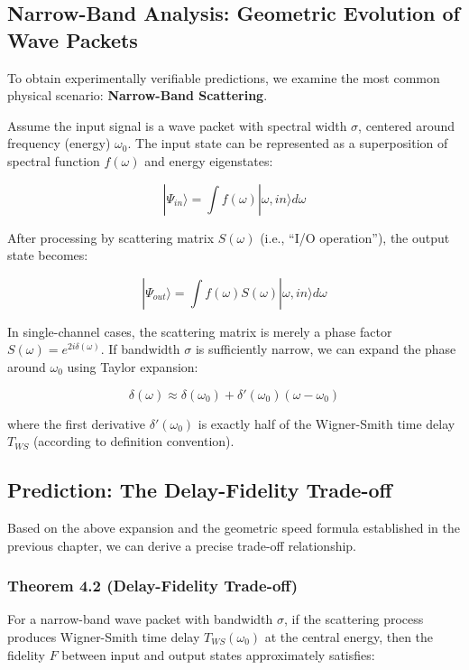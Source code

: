 \documentclass[11pt,a4paper,twoside]{book}
\begin{document}
\subsection{Narrow-Band Analysis: Geometric Evolution of Wave Packets}

To obtain experimentally verifiable predictions, we examine the most common physical scenario: \textbf{Narrow-Band Scattering}.

Assume the input signal is a wave packet with spectral width \textbf{$\sigma$}, centered around frequency (energy) \textbf{$\omega_0$}. The input state can be represented as a superposition of spectral function $f(\omega)$ and energy eigenstates:

$$|\Psi_{in}\rangle = \int f(\omega) |\omega, in\rangle d\omega$$

After processing by scattering matrix $S(\omega)$ (i.e., ``I/O operation''), the output state becomes:

$$|\Psi_{out}\rangle = \int f(\omega) S(\omega) |\omega, in\rangle d\omega$$

In single-channel cases, the scattering matrix is merely a phase factor $S(\omega) = e^{2i\delta(\omega)}$. If bandwidth $\sigma$ is sufficiently narrow, we can expand the phase around $\omega_0$ using Taylor expansion:

$$\delta(\omega) \approx \delta(\omega_0) + \delta'(\omega_0)(\omega - \omega_0)$$

where the first derivative $\delta'(\omega_0)$ is exactly half of the Wigner-Smith time delay $T_{WS}$ (according to definition convention).

\subsection{Prediction: The Delay-Fidelity Trade-off}

Based on the above expansion and the geometric speed formula established in the previous chapter, we can derive a precise trade-off relationship.

\subsubsection{Theorem 4.2 (Delay-Fidelity Trade-off)}

For a narrow-band wave packet with bandwidth \textbf{$\sigma$}, if the scattering process produces Wigner-Smith time delay \textbf{$T_{WS}(\omega_0)$} at the central energy, then the fidelity \textbf{$F$} between input and output states approximately satisfies:
\end{document}
